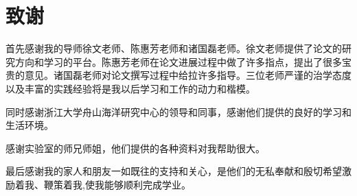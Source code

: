 \renewcommand{\baselinestretch}{1.5}
\fontsize{12pt}{13pt}\selectfont
{}
\chapter*{致谢}
首先感谢我的导师徐文老师、陈惠芳老师和诸国磊老师。徐文老师提供了论文的研究方向和学习的平台。陈惠芳老师在论文进展过程中做了许多指点，提出了很多宝贵的意见。诸国磊老师对论文撰写过程中给拉许多指导。三位老师严谨的治学态度以及丰富的实践经验将是我以后学习和工作的动力和楷模。

同时感谢浙江大学舟山海洋研究中心的领导和同事，感谢他们提供的良好的学习和生活环境。

感谢实验室的师兄师姐，他们提供的各种资料对我帮助很大。

最后感谢我的家人和朋友一如既往的支持和关心，是他们的无私奉献和殷切希望激励着我、鞭策着我,使我能够顺利完成学业。
\clearpage
\endinput